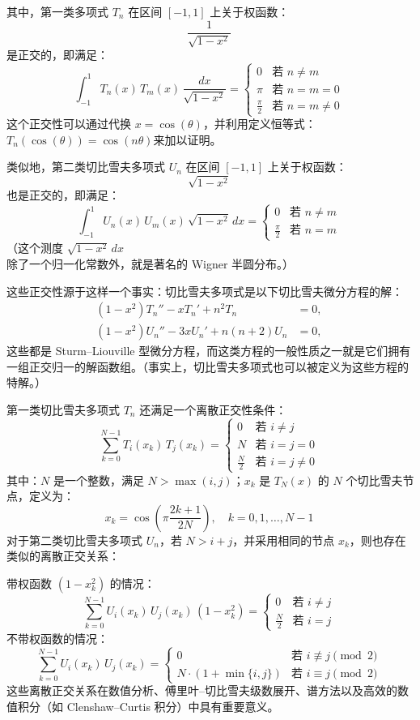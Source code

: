 其中，第一类多项式 $T_n$ 在区间 $[-1,1]$ 上关于权函数：
$$
\frac{1}{\sqrt{1 - x^2}}~
$$
是正交的，即满足：
$$
\int_{-1}^{1} T_n(x) \, T_m(x) \, \frac{dx}{\sqrt{1 - x^2}} =
\begin{cases}
0 & \text{若 } n \ne m \\
\pi & \text{若 } n = m = 0 \\
\frac{\pi}{2} & \text{若 } n = m \ne 0
\end{cases}~
$$
这个正交性可以通过代换 $x = \cos(\theta)$，并利用定义恒等式：$T_n(\cos(\theta)) = \cos(n\theta)$来加以证明。

类似地，第二类切比雪夫多项式 $U_n$ 在区间 $[-1,1]$ 上关于权函数：
$$
\sqrt{1 - x^2}~
$$
也是正交的，即满足：
$$
\int_{-1}^{1} U_n(x) \, U_m(x) \, \sqrt{1 - x^2} \, dx =
\begin{cases}
0 & \text{若 } n \ne m \\
\frac{\pi}{2} & \text{若 } n = m
\end{cases}~
$$
（这个测度 $\sqrt{1 - x^2} \, dx$ 除了一个归一化常数外，就是著名的 Wigner 半圆分布。）

这些正交性源于这样一个事实：切比雪夫多项式是以下切比雪夫微分方程的解：
$$
\begin{aligned}
(1 - x^2) T_n'' - x T_n' + n^2 T_n &= 0, \\
(1 - x^2) U_n'' - 3x U_n' + n(n + 2) U_n &= 0,
\end{aligned}~
$$
这些都是 Sturm–Liouville 型微分方程，而这类方程的一般性质之一就是它们拥有一组正交归一的解函数组。（事实上，切比雪夫多项式也可以被定义为这些方程的特解。）

第一类切比雪夫多项式 $T_n$ 还满足一个离散正交性条件：
$$
\sum_{k = 0}^{N - 1} T_i(x_k) \, T_j(x_k) =
\begin{cases}
0 & \text{若 } i \ne j \\
N & \text{若 } i = j = 0 \\
\frac{N}{2} & \text{若 } i = j \ne 0
\end{cases}~
$$
其中：$N$ 是一个整数，满足 $N > \max(i, j)$；$x_k$ 是 $T_N(x)$ 的 $N$ 个切比雪夫节点，定义为：
$$
x_k = \cos\left( \pi\frac{2k + 1}{2N} \right), \quad k = 0, 1, \dots, N - 1~
$$
对于第二类切比雪夫多项式 $U_n$，若 $N > i + j$，并采用相同的节点 $x_k$，则也存在类似的离散正交关系：

带权函数 $(1 - x_k^2)$ 的情况：
$$
\sum_{k = 0}^{N - 1} U_i(x_k) \, U_j(x_k) \, (1 - x_k^2) =
\begin{cases}
0 & \text{若 } i \ne j \\
\frac{N}{2} & \text{若 } i = j
\end{cases}~
$$
不带权函数的情况：
$$
\sum_{k = 0}^{N - 1} U_i(x_k) \, U_j(x_k) =
\begin{cases}
0 & \text{若 } i \not\equiv j \pmod{2} \\
N \cdot (1 + \min\{i, j\}) & \text{若 } i \equiv j \pmod{2}
\end{cases}~
$$
这些离散正交关系在数值分析、傅里叶–切比雪夫级数展开、谱方法以及高效的数值积分（如 Clenshaw–Curtis 积分）中具有重要意义。

